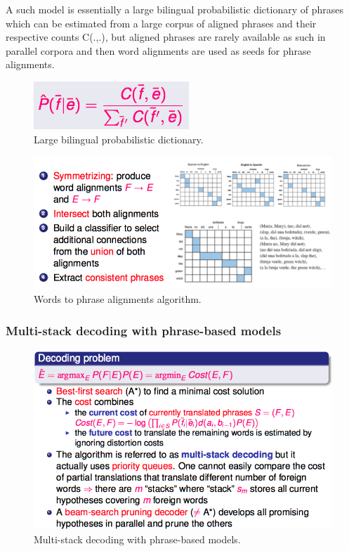 A such model is essentially a large bilingual probabilistic dictionary of phrases which can be estimated from a large corpus of aligned phrases and their respective counts C(.,.), but aligned phrases are rarely available as such in parallel corpora and then word alignments are used as seeds for phrase alignments.

\begin{figure}[H]
	\centering
	\includegraphics[scale=0.6]{images/64_param.png}
 	\caption{Large bilingual probabilistic dictionary.}
\end{figure}


\begin{figure}[H]
	\centering
	\includegraphics[scale=0.6]{images/65_ali.png}
 	\caption{Words to phrase alignments algorithm.}
\end{figure}

\subsubsection{Multi-stack decoding with phrase-based models}

\begin{figure}[htp]
	\centering
	\includegraphics[scale=0.6]{images/66_stacks.png}
 	\caption{Multi-stack decoding with phrase-based models.}
\end{figure}

